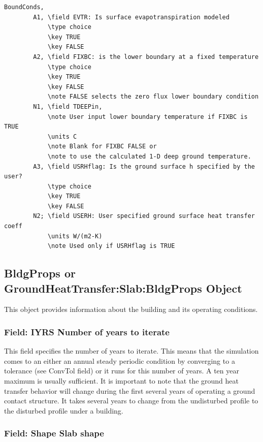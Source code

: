 \begin{lstlisting}
BoundConds,
        A1, \field EVTR: Is surface evapotranspiration modeled
            \type choice
            \key TRUE
            \key FALSE
        A2, \field FIXBC: is the lower boundary at a fixed temperature
            \type choice
            \key TRUE
            \key FALSE
            \note FALSE selects the zero flux lower boundary condition
        N1, \field TDEEPin,
            \note User input lower boundary temperature if FIXBC is TRUE
            \units C
            \note Blank for FIXBC FALSE or
            \note to use the calculated 1-D deep ground temperature.
        A3, \field USRHflag: Is the ground surface h specified by the user?
            \type choice
            \key TRUE
            \key FALSE
        N2; \field USERH: User specified ground surface heat transfer coeff
            \units W/(m2-K)
            \note Used only if USRHflag is TRUE
\end{lstlisting}

\subsection{BldgProps or GroundHeatTransfer:Slab:BldgProps Object}\label{bldgprops-or-groundheattransferslabbldgprops-object}

This object provides information about the building and its operating conditions.

\subsubsection{Field: IYRS Number of years to iterate}\label{field-iyrs-number-of-years-to-iterate}

This field specifies the number of years to iterate. This means that the simulation comes to an either an annual steady periodic condition by converging to a tolerance (see ConvTol field) or it runs for this number of years. A ten year maximum is usually sufficient. It is important to note that the ground heat transfer behavior will change during the first several years of operating a ground contact structure. It takes several years to change from the undisturbed profile to the disturbed profile under a building.

\subsubsection{Field: Shape Slab shape}\label{field-shape-slab-shape}

